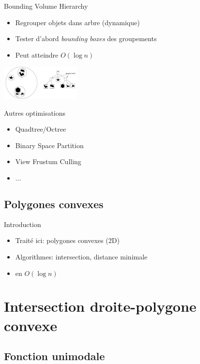 \documentclass{beamer}
\begin{document}
\begin{frame}{Bounding Volume Hierarchy}
	\begin{itemize}
	\item Regrouper objets dans arbre (dynamique)
	\item Tester d'abord \emph{bounding boxes} des groupements
	\item Peut atteindre $O(\log n)$
	\end{itemize}
	\begin{center}
	\includegraphics[width=4cm]{bvh.png}
	\end{center}
\end{frame}


\begin{frame}{Autres optimisations}
	\begin{itemize}
	\item Quadtree/Octree
	\item Binary Space Partition
	\item View Frustum Culling
	\item ...
	\end{itemize}
\end{frame}

\subsection{Polygones convexes}
\begin{frame}{Introduction}
	\begin{itemize}
	\item Traité ici: polygones convexes (2D)
	\item Algorithmes: intersection, distance minimale
	\item en $O(\log n)$
	\end{itemize}
\end{frame}

\section{Intersection droite-polygone convexe}
\subsection{Fonction unimodale}
\end{document}
